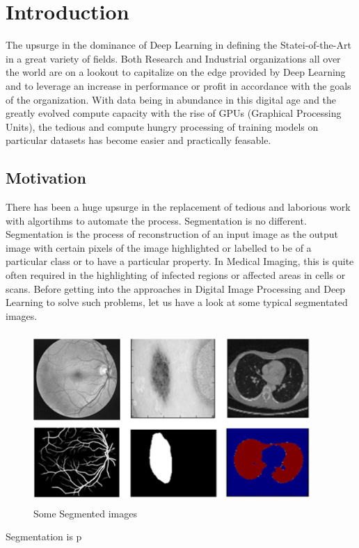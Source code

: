 \documentclass[19pt]{article}
\begin{document}
\section{Introduction}
The upsurge in the dominance of Deep Learning in defining the Statei-of-the-Art in a great variety of fields. Both Research and Industrial organizations all over the world are on a lookout to capitalize on the edge provided by Deep Learning and to leverage an increase in performance or profit in accordance with the goals of the organization. With data being in abundance in this digital age and the greatly evolved compute capacity with the rise of GPUs (Graphical Processing Units), the tedious and compute hungry processing of training models on particular datasets has become easier and practically feasable.

\subsection{Motivation}
There has been a huge upsurge in the replacement of tedious and laborious work with algortihms to automate the process. Segmentation is no different. Segmentation is the process of reconstruction of an input image as the output image with certain pixels of the image highlighted or labelled to be of a particular class or to have a particular property. In Medical Imaging, this is quite often required in the highlighting of infected regions or affected areas in cells or scans. Before getting into the approaches in Digital Image Processing and Deep Learning to solve such problems, let us have a look at some typical segmentated images.

\begin{center}
    \begin{figure}[!h!t!b]
        \centerline{\includegraphics[width=105mm,height=65mm]{images/segs.png}}
        \caption{Some Segmented images}
        \label{fig:1}
    \end{figure}
\end{center}

Segmentation is p
\cite{kour2014real}

  



\end{document}
